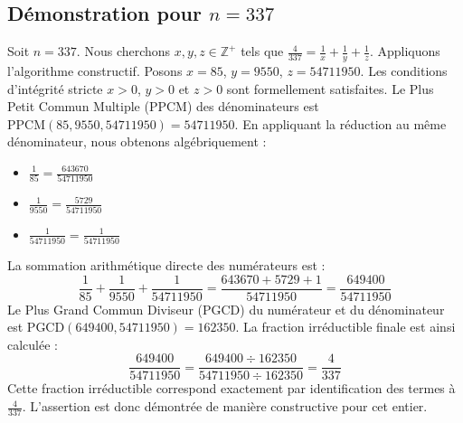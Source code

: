 \documentclass[11pt,a4paper]{article}
\begin{document}
\subsection{Démonstration pour $n = 337$}
Soit $n = 337$. Nous cherchons $x, y, z \in \mathbb{Z}^{+}$ tels que $\frac{4}{337} = \frac{1}{x} + \frac{1}{y} + \frac{1}{z}$.
Appliquons l'algorithme constructif. Posons $x = 85$, $y = 9550$, $z = 54711950$.
Les conditions d'intégrité stricte $x > 0$, $y > 0$ et $z > 0$ sont formellement satisfaites.
Le Plus Petit Commun Multiple (PPCM) des dénominateurs est $\text{PPCM}(85, 9550, 54711950) = 54711950$.
En appliquant la réduction au même dénominateur, nous obtenons algébriquement :
\begin{itemize}
    \item $\frac{1}{85} = \frac{643670}{54711950}$
    \item $\frac{1}{9550} = \frac{5729}{54711950}$
    \item $\frac{1}{54711950} = \frac{1}{54711950}$
\end{itemize}
La sommation arithmétique directe des numérateurs est :
$$ \frac{1}{85} + \frac{1}{9550} + \frac{1}{54711950} = \frac{643670 + 5729 + 1}{54711950} = \frac{649400}{54711950} $$
Le Plus Grand Commun Diviseur (PGCD) du numérateur et du dénominateur est $\text{PGCD}(649400, 54711950) = 162350$.
La fraction irréductible finale est ainsi calculée :
$$ \frac{649400}{54711950} = \frac{649400 \div 162350}{54711950 \div 162350} = \frac{4}{337} $$
Cette fraction irréductible correspond exactement par identification des termes à $\frac{4}{337}$. L'assertion est donc démontrée de manière constructive pour cet entier.
\end{document}
